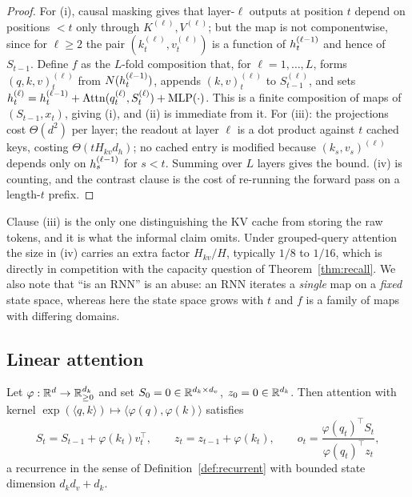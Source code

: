 \begin{proof}
For (i), causal masking gives that layer-$\ell$ outputs at position $t$ depend on
positions $<t$ only through $K^{(\ell)},V^{(\ell)}$; but the map is not
componentwise, since for $\ell \ge 2$ the pair $(k^{(\ell)}_t, v^{(\ell)}_t)$ is
a function of $h^{(\ell-1)}_t$ and hence of $S_{t-1}$. Define $f$ as the $L$-fold
composition that, for $\ell = 1,\dots,L$, forms
$(q,k,v)^{(\ell)}_t$ from $N(h^{(\ell-1)}_t)$, appends $(k,v)^{(\ell)}_t$ to
$S^{(\ell)}_{t-1}$, and sets
$h^{(\ell)}_t = h^{(\ell-1)}_t + \mathrm{Attn}(q^{(\ell)}_t, S^{(\ell)}_t) + \mathrm{MLP}(\cdot)$.
This is a finite composition of maps of $(S_{t-1},x_t)$, giving (i), and (ii) is
immediate from it. For (iii): the projections cost $\Theta(d^2)$ per layer; the
readout at layer $\ell$ is a dot product against $t$ cached keys, costing
$\Theta(t H_{kv} d_h)$; no cached entry is modified because $(k_s,v_s)^{(\ell)}$
depends only on $h^{(\ell-1)}_s$ for $s<t$. Summing over $L$ layers gives the
bound. (iv) is counting, and the contrast clause is the cost of re-running the
forward pass on a length-$t$ prefix.
\end{proof}

\begin{remark}
Clause (iii) is the only one distinguishing the KV cache from storing the raw
tokens, and it is what the informal claim omits. Under grouped-query attention
the size in (iv) carries an extra factor $H_{kv}/H$, typically $1/8$ to $1/16$,
which is directly in competition with the capacity question of
Theorem~\ref{thm:recall}. We also note that ``is an RNN'' is an abuse: an RNN
iterates a \emph{single} map on a \emph{fixed} state space, whereas here the
state space grows with $t$ and $f$ is a family of maps with differing domains.
\end{remark}

\subsection{Linear attention}

\begin{theorem}
\label{thm:linattn}
Let $\varphi : \mathbb{R}^{d} \to \mathbb{R}^{d_k}_{\ge 0}$ and set $S_0 = 0 \in \mathbb{R}^{d_k \times d_v}$,
$z_0 = 0 \in \mathbb{R}^{d_k}$. Then attention with kernel
$\exp(\langle q,k\rangle) \mapsto \langle \varphi(q), \varphi(k)\rangle$ satisfies
\begin{equation}
  S_t = S_{t-1} + \varphi(k_t) v_t^{\top},
  \qquad
  z_t = z_{t-1} + \varphi(k_t),
  \qquad
  o_t = \frac{\varphi(q_t)^{\top} S_t}{\varphi(q_t)^{\top} z_t},
  \label{eq:linattn}
\end{equation}
a recurrence in the sense of Definition~\ref{def:recurrent} with bounded state
dimension $d_k d_v + d_k$.
\end{theorem}

